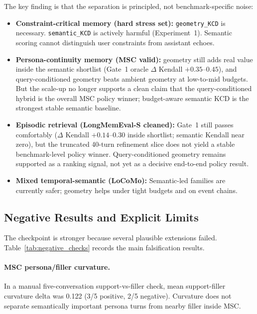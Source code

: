 \documentclass[conference]{IEEEtran}
\begin{document}
The key finding is that the separation is principled, not benchmark-specific noise:
\begin{itemize}[leftmargin=1.4em]
    \item \textbf{Constraint-critical memory (hard stress set):} \texttt{geometry\_KCD} is necessary. \texttt{semantic\_KCD} is actively harmful (Experiment~1). Semantic scoring cannot distinguish user constraints from assistant echoes.
    \item \textbf{Persona-continuity memory (MSC valid):} geometry still adds real value inside the semantic shortlist (Gate~1 oracle $\Delta$ Kendall $+0.35$--$0.45$), and query-conditioned geometry beats ambient geometry at low-to-mid budgets. But the scale-up no longer supports a clean claim that the query-conditioned hybrid is the overall MSC policy winner; budget-aware semantic KCD is the strongest stable semantic baseline.
    \item \textbf{Episodic retrieval (LongMemEval-S cleaned):} Gate~1 still passes comfortably ($\Delta$ Kendall $+0.14$--$0.30$ inside shortlist; semantic Kendall near zero), but the truncated 40-turn refinement slice does not yield a stable benchmark-level policy winner. Query-conditioned geometry remains supported as a ranking signal, not yet as a decisive end-to-end policy result.
    \item \textbf{Mixed temporal-semantic (LoCoMo):} Semantic-led families are currently safer; geometry helps under tight budgets and on event chains.
\end{itemize}

\subsection{Negative Results and Explicit Limits}
\label{sec:negative}
The checkpoint is stronger because several plausible extensions failed. Table~\ref{tab:negative_checks} records the main falsification results.

\begin{table}[t]
    \centering
    \caption{Negative-result checkpoints. These tests sharpen the claim boundary of the geometry program.}
    \label{tab:negative_checks}
    \resizebox{\columnwidth}{!}{}
\end{table}

\paragraph{MSC persona/filler curvature.} In a manual five-conversation support-vs-filler check, mean support-filler curvature delta was 0.122 (3/5 positive, 2/5 negative). Curvature does not separate semantically important persona turns from nearby filler inside MSC.
\end{document}
